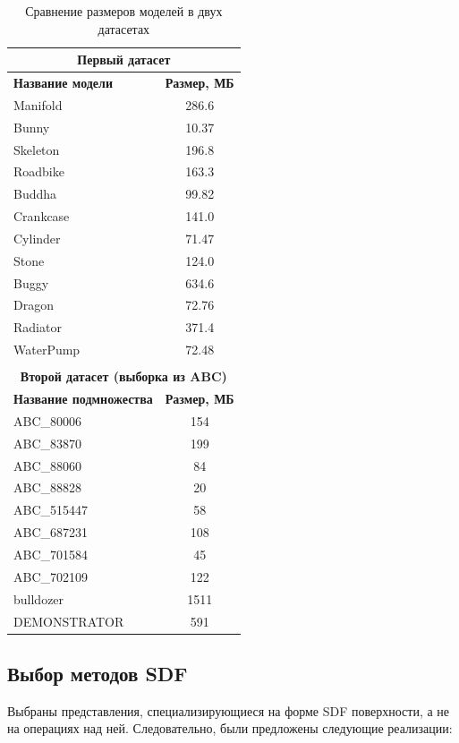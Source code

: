 \documentclass[a4paper,hidelinks,12pt]{article}
\begin{document}
\begin{table}[h!]
	\centering
	\begin{tabular}{|l|c|}
			\hline
			\multicolumn{2}{|c|}{\textbf{Первый датасет}} \\
			\hline
			\textbf{Название модели} & \textbf{Размер, МБ} \\
			\hline
			Manifold     & 286.6 \\
			Bunny  & 10.37  \\
			Skeleton & 196.8 \\
			Roadbike & 163.3 \\
			Buddha     & 99.82 \\
			Crankcase & 141.0 \\
			Cylinder & 71.47 \\
			Stone & 124.0 \\
			Buggy & 634.6 \\
			Dragon & 72.76 \\
			Radiator & 371.4 \\
			WaterPump & 72.48 \\
			\hline
			\multicolumn{2}{c}{} \\[-1.5ex]
			\hline
			\multicolumn{2}{|c|}{\textbf{Второй датасет (выборка из ABC)}} \\
			\hline
			\textbf{Название подмножества} & \textbf{Размер, МБ} \\
			\hline
			ABC\_80006 & 154 \\
			ABC\_83870 & 199 \\
			ABC\_88060 & 84 \\
			ABC\_88828 & 20 \\
			ABC\_515447 & 58 \\
			ABC\_687231 & 108 \\
			ABC\_701584 & 45 \\
			ABC\_702109 & 122 \\
			bulldozer & 1511 \\
			DEMONSTRATOR & 591 \\
			\hline
	\end{tabular}
	\caption{Сравнение размеров моделей в двух датасетах}
	\label{tab:dataset_sizes}
\end{table}

\newpage

\subsection{Выбор методов SDF}

Выбраны представления, специализирующиеся на форме SDF поверхности, а не на операциях над ней. Следовательно, были предложены следующие реализации:
\end{document}
